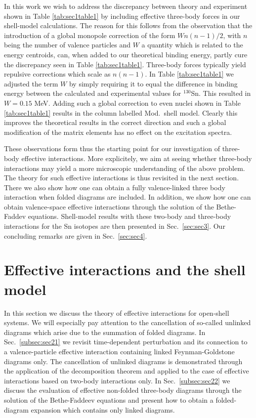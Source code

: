 In this work we wish to address the discrepancy between theory and experiment
shown in Table \ref{tab:sec1table1} by including effective three-body
forces in our shell-model calculations. The reason for this follows
from the observation that the introduction of a global monopole correction
of the form $Wn(n-1)/2$, with $n$ being the number of valence particles and
$W$ a quantity which is related to the energy centroids, 
can, when added to our theoretical binding energy, partly cure the 
discrepancy seen in Table \ref{tab:sec1table1}. Three-body forces
typically yield repulsive corrections which scale as $n(n-1)$.  
In Table \ref{tab:sec1table1} we adjusted the term $W$ by simply requiring
it to equal the difference in binding energy between the calculated and
experimental values for $^{130}$Sn. This resulted in $W=0.15$ MeV.
Adding such a global correction to even nuclei shown in Table  
\ref{tab:sec1table1} results in the column labelled Mod.\ shell model.
Clearly this improves the theoretical results in the correct direction
and such a global modification of the matrix elements has no
effect on the excitation spectra. 

These observations form thus the starting point for our investigation
of three-body effective interactions. 
More explicitely, we aim at seeing whether three-body interactions
may yield a more microscopic understanding of the above problem. 
The theory for such effective interactions is thus revisited  
in the next section.
There we also show how one can obtain a fully valence-linked 
three body interaction when folded diagrams are included. In addition,
we show how one can obtain valence-space effective interactions
through the solution of the Bethe-Faddev equations.
Shell-model results with these two-body and three-body interactions
for the Sn isotopes are then presented in Sec.\ \ref{sec:sec3}.
Our concluding remarks are given in Sec.\ \ref{sec:sec4}. 

\section{Effective interactions and the shell model}\label{sec:sec2}

In this section we discuss the theory of effective interactions
for open-shell systems. We will especially pay attention
to the cancellation of so-called unlinked diagrams which arise
due to the summation of
folded diagrams. In Sec.\ \ref{subsec:sec21} we revisit time-dependent
perturbation and its connection to a valence-particle effective
interaction containing linked Feynman-Goldstone diagrams only.
The cancellation of unlinked diagrams is demonstrated through the 
application of the decomposition theorem and applied to the 
case of effective interactions based on two-body interactions 
only.
In  Sec.\ \ref{subsec:sec22} we discuss the evaluation of 
effective non-folded three-body diagrams 
through the solution of the Bethe-Faddeev equations 
and present how to 
obtain a folded-diagram expansion which contains only linked
diagrams. 


